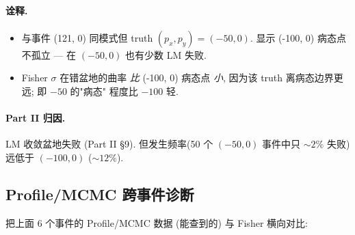 \paragraph{诠释.}
\begin{itemize}[nosep]
  \item 与事件 (121, 0) 同模式但 truth $(p_x, p_y) = (-50, 0)$. 显示 (-100, 0) 病态点不孤立 — 在 $(-50, 0)$ 也有少数 LM 失败.
  \item Fisher $\sigma$ 在错盆地的曲率 \emph{比} (-100, 0) 病态点 \emph{小}, 因为该 truth 离病态边界更远; 即 $-50$ 的"病态" 程度比 $-100$ 轻.
\end{itemize}

\paragraph{Part II 归因.}
LM 收敛盆地失败 (Part II §9). 但发生频率(50 个 $(-50, 0)$ 事件中只 $\sim 2\%$ 失败) 远低于 $(-100, 0)$ ($\sim 12\%$).

\subsection{Profile/MCMC 跨事件诊断}
\label{sec:partIII:case_studies:profile_mcmc}

把上面 6 个事件的 Profile/MCMC 数据 (能查到的) 与 Fisher 横向对比:

